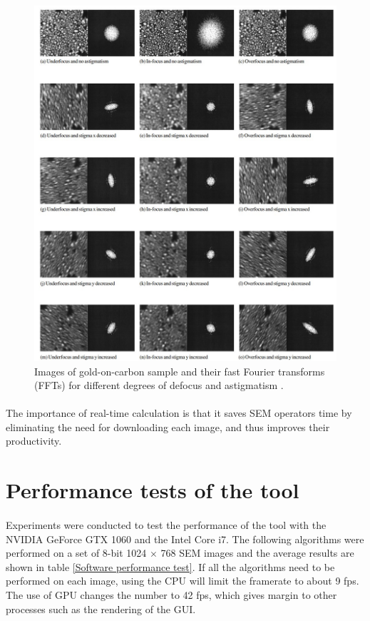 \documentclass[12pt, twocolumn]{report}
\begin{document}
\begin{figure}
    \centering
    \includegraphics[width=1.05\textwidth]{Figures/SEM astigmatism and FFT.jpg}
    \caption{Images of gold-on-carbon sample and their fast Fourier transforms (FFTs) for different degrees of defocus and astigmatism \cite{SEM correction algorithm}.}
    \label{SEM astigmatism}
\end{figure}

\paragraph{}
The importance of real-time calculation is that it saves SEM operators time by eliminating the need for downloading each image, and thus improves their productivity.

\section{Performance tests of the tool}
\paragraph{}
Experiments were conducted to test the performance of the tool with the NVIDIA GeForce GTX 1060 and the Intel Core i7. The following algorithms were performed on a set of 8-bit 1024 $\times$ 768 SEM images and the average results are shown in table \ref{Software performance test}. If all the algorithms need to be performed on each image, using the CPU will limit the framerate to about 9 fps. The use of GPU changes the number to 42 fps, which gives margin to other processes such as the rendering of the GUI.
\end{document}
